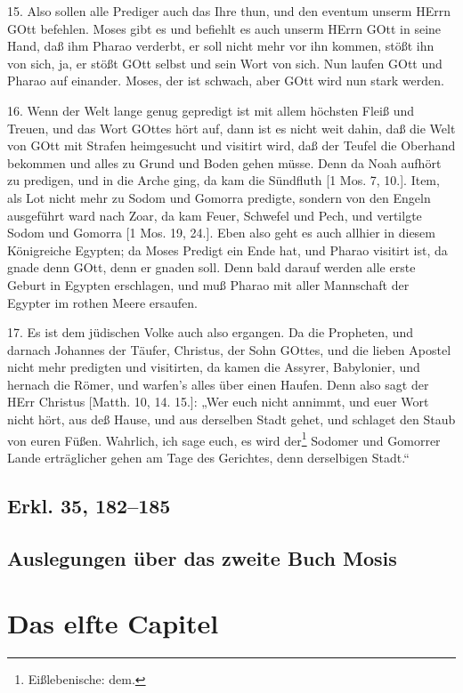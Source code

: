 15. Also sollen alle Prediger auch das Ihre thun, und den eventum unserm HErrn GOtt befehlen. Moses gibt es und befiehlt es auch unserm HErrn GOtt in seine Hand, daß ihm Pharao verderbt, er soll nicht mehr vor ihn kommen, stößt ihn von sich, ja, er stößt GOtt selbst und sein Wort von sich. Nun laufen GOtt und Pharao auf einander. Moses, der ist schwach, aber GOtt wird nun stark werden.

16. Wenn der Welt lange genug gepredigt ist mit allem höchsten Fleiß und Treuen, und das Wort GOttes hört auf, dann ist es nicht weit dahin, daß die Welt von GOtt mit Strafen heimgesucht und visitirt wird, daß der Teufel die Oberhand bekommen und alles zu Grund und Boden gehen müsse. Denn da Noah aufhört zu predigen, und in die Arche ging, da kam die Sündfluth [1 Mos. 7, 10.]. Item, als Lot nicht mehr zu Sodom und Gomorra predigte, sondern von den Engeln ausgeführt ward nach Zoar, da kam Feuer, Schwefel und Pech, und vertilgte Sodom und Gomorra [1 Mos. 19, 24.]. Eben also geht es auch allhier in diesem Königreiche Egypten; da Moses Predigt ein Ende hat, und Pharao visitirt ist, da gnade denn GOtt, denn er gnaden soll. Denn bald darauf werden alle erste Geburt in Egypten erschlagen, und muß Pharao mit aller Mannschaft der Egypter im rothen Meere ersaufen.

17. Es ist dem jüdischen Volke auch also ergangen. Da die Propheten, und darnach Johannes der Täufer, Christus, der Sohn GOttes, und die lieben Apostel nicht mehr predigten und visitirten, da kamen die Assyrer, Babylonier, und hernach die Römer, und warfen’s alles über einen Haufen. Denn also sagt der HErr Christus [Matth. 10, 14. 15.]: „Wer euch nicht annimmt, und euer Wort nicht hört, aus deß Hause, und aus derselben Stadt gehet, und schlaget den Staub von euren Füßen. Wahrlich, ich sage euch, es wird der\footnote{Eißlebenische: dem.} Sodomer und Gomorrer Lande erträglicher gehen am Tage des Gerichtes, denn derselbigen Stadt.“

\subsection{Erkl. 35, 182–185}

\subsection{Auslegungen über das zweite Buch Mosis}

\section{Das elfte Capitel}

